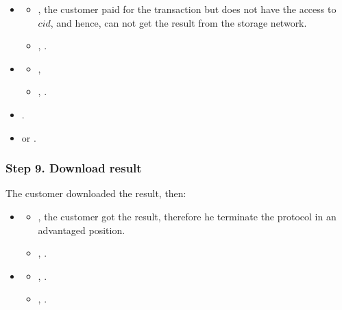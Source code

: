 \documentclass[pdftex,twocolumn,epjc3]{svjour3}
\begin{document}
{\ActedAbnormallyThen{\customer}

\begin{itemize}
\item \AgreeablePath
  \begin{itemize}
    \item {}, the customer paid for the transaction but does not have the access to $cid$, and hence, can not get the result from the storage network.
    \item {}, \SpReceivedThePayment{}.
  \end{itemize}
\item \DisputePath
  \begin{itemize}
    \item {}, \CustomerLosesBecauseSPCanProveBeingCorrect{}
    \item {}, .
  \end{itemize}
\end{itemize}


\Fairness

\begin{itemize}
  \item {}.
  \item \CanDoNothing{}  or .
\end{itemize}

\subsubsection*{Step 9. \CustomerTurn{} Download result}\label{step-9-retrieval-of-results}

The customer downloaded the result, then:

\begin{itemize}
\item \AgreeablePath
  \begin{itemize}
    \item {}, the customer got the result, therefore he terminate the protocol in an advantaged position.
    \item {}, .
  \end{itemize}
\item \DisputePath
  \begin{itemize}
    \item {}, \CustomerLosesBecauseSPCanProveBeingCorrect{}.
    \item {}, .
  \end{itemize}
\end{itemize}

}
\end{document}
